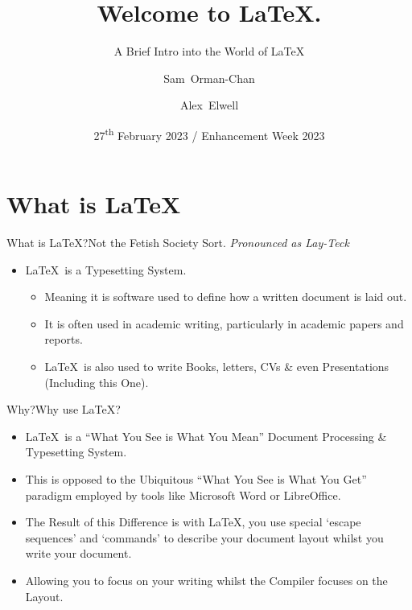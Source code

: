 \documentclass{beamer}
\title[] %
{Welcome to \LaTeX.}
\subtitle
{A Brief Intro into the World of \LaTeX} %
\author[] %
{Sam~Orman-Chan \and Alex~Elwell}
\institute[] %
{%
 University of Lincoln --- School of Computer Science}
\date[] %
{27\textsuperscript{th} February 2023 / Enhancement Week 2023}
\begin{document}
\begin{frame}
  \titlepage
\end{frame}



\section{What is \LaTeX}

\begin{frame}{What is LaTeX?}{Not the Fetish Society Sort.}
\emph{Pronounced as Lay-Teck}
  \begin{itemize}
  \item
   \LaTeX~is a Typesetting System.
  \begin{itemize}\item Meaning it is software used to define how a written document is laid out.
  \item It is often used in academic writing, particularly in academic papers and reports.
  \item \LaTeX~is also used to write Books, letters, CVs \& even Presentations (Including this One).
   \end{itemize}
  \end{itemize}
\end{frame}

\begin{frame}{Why?}{Why use \LaTeX?}
\begin{itemize}
\item \LaTeX~is a ``What You See is What You Mean'' Document Processing \& Typesetting System.
\item This is opposed to the Ubiquitous ``What You See is What You Get'' paradigm employed by tools like Microsoft Word or LibreOffice.
\item The Result of this Difference is with \LaTeX, you use special `escape sequences' and `commands' to describe your document layout whilst you write your document. 
\item Allowing you to focus on your writing whilst the Compiler focuses on the Layout.
\end{itemize}
\end{frame}
\end{document}
